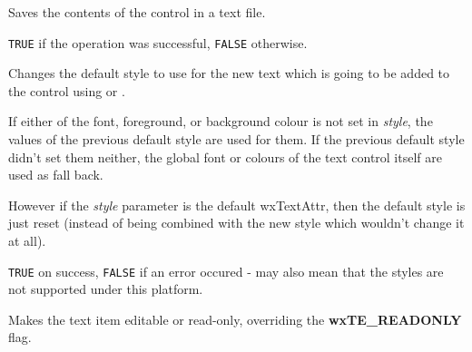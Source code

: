 
Saves the contents of the control in a text file.




{\tt TRUE} if the operation was successful, {\tt FALSE} otherwise.

\label{wxtextctrlsetdefaultstyle}


Changes the default style to use for the new text which is going to be added
to the control using  or\rtfsp
{}.

If either of the font, foreground, or background colour is not set in\rtfsp
{\it style}, the values of the previous default style are used for them. If
the previous default style didn't set them neither, the global font or colours
of the text control itself are used as fall back.

However if the {\it style} parameter is the default wxTextAttr, then the
default style is just reset (instead of being combined with the new style which
wouldn't change it at all).




{\tt TRUE} on success, {\tt FALSE} if an error occured - may also mean that
the styles are not supported under this platform.



\label{wxtextctrlseteditable}


Makes the text item editable or read-only, overriding the {\bf wxTE\_READONLY} flag.



